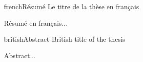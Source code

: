 \cleardoublepage
\pagestyle{empty}
\null
\newpage
\abstract%
{french}{Résumé}%
{Le titre de la thèse en français}%
{
  Résumé en français...

}
{british}{Abstract}%
{British title of the thesis}%
{
  Abstract...

}

